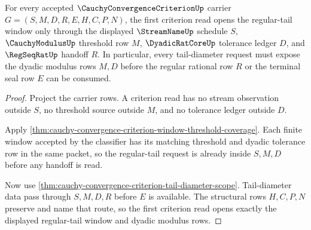 \begin{theorem}
\label{thm:cauchy-convergence-criterion-regular-tail-window}
For every accepted $\CauchyConvergenceCriterionUp$ carrier $G=(S,M,D,R,E,H,C,P,N)$, the first criterion read opens the regular-tail window only through the displayed $\StreamNameUp$ schedule $S$, $\CauchyModulusUp$ threshold row $M$, $\DyadicRatCoreUp$ tolerance ledger $D$, and $\RegSeqRatUp$ handoff $R$. In particular, every tail-diameter request must expose the dyadic modulus rows $M,D$ before the regular rational row $R$ or the terminal seal row $E$ can be consumed.
\end{theorem}
\begin{proof}
Project the carrier rows. A criterion read has no stream observation outside $S$, no threshold source outside $M$, and no tolerance ledger outside $D$.

Apply \autoref{thm:cauchy-convergence-criterion-window-threshold-coverage}. Each finite window accepted by the classifier has its matching threshold and dyadic tolerance row in the same packet, so the regular-tail request is already inside $S,M,D$ before any handoff is read.

Now use \autoref{thm:cauchy-convergence-criterion-tail-diameter-scope}. Tail-diameter data pass through $S,M,D,R$ before $E$ is available. The structural rows $H,C,P,N$ preserve and name that route, so the first criterion read opens exactly the displayed regular-tail window and dyadic modulus rows.
\end{proof}

